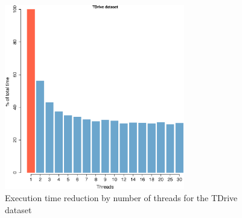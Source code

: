 {\begin{figure}[h!]
    \centering
    \includegraphics[width=0.7\textwidth]{images/TDrive_thread.eps}
    \caption{Execution time reduction by number of threads for the TDrive dataset}
    \label{fig:tdrive_threads}
\end{figure}

}
